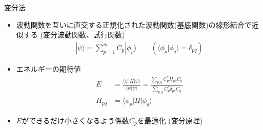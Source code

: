 
\begin{frame}[t,fragile]{変分法}
  \begin{itemize}
  \item 波動関数を互いに直交する正規化された波動関数(基底関数)の線形結合で近似する (変分波動関数、試行関数)
    \begin{align*}
      | \psi \rangle = \sum_{p=1}^m C_p | \phi_p \rangle \qquad (\langle \phi_p | \phi_q \rangle = \delta_{pq})
    \end{align*}
  \item エネルギーの期待値
    \begin{align*}
      E &= \frac{\langle \psi | H | \psi \rangle}{\langle \psi | \psi \rangle} = \frac{\sum_{p,q} C_p^* H_{pq} C_q}{\sum_{p,q} C_p^* \delta_{pq} C_q} \\
      H_{pq} &= \langle \phi_p | H | \phi_q \rangle
    \end{align*}
  \item $E$ができるだけ小さくなるよう係数$C_p$を最適化 (変分原理)
  \end{itemize}
\end{frame}
